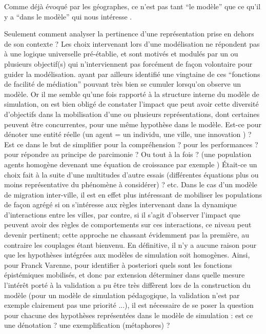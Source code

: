 Comme déjà évoqué par les géographes, ce n'est pas tant \enquote{le modèle} que ce qu'il y a \enquote{dans le modèle} qui nous intéresse \autocites{Sanders2000, Besse2000}.

Seulement comment analyser la pertinence d'une représentation prise en dehors de son contexte ? Les choix intervenant lors d'une modélisation ne répondent pas à une logique universelle pré-établie, et sont motivés et modulés par un ou plusieurs objectif(s) qui n’interviennent pas forcément de façon volontaire pour guider la modélisation. \textcite{Varenne2013} ayant par ailleurs identifié une vingtaine de ces \enquote{fonctions de facilité de médiation} pouvant très bien se cumuler lorsqu’on observe un modèle. Or il me semble qu'une fois rapporté à la structure interne du modèle de simulation, on est bien obligé de constater l'impact que peut avoir cette diversité d'objectifs dans la mobilisation d’une ou plusieurs représentations, dont certaines peuvent être concurrentes, pour une même hypothèse dans le modèle. Est-ce pour dénoter une entité réelle (un agent = un individu, une ville, une innovation ) ? Est ce dans le but de simplifier pour la compréhension ? pour les performances ? pour répondre au principe de parcimonie ? Ou tout à la fois ? (une population agents homogène devenant une équation de croissance par exemple ) Était-ce un choix fait à la suite d’une multitudes d'autre essais (différentes équations plus ou moins représentative du phénomène à considérer) ? etc. Dans le cas d'un modèle de migration inter-ville, il est en effet plus intéressant de mobiliser les populations de façon agrégé si on s'intéresse aux règles intervenant dans la dynamique d'interactions entre les villes, par contre, si il s'agit d'observer l'impact que peuvent avoir des règles de comportements sur ces interactions, ce niveau peut devenir pertinent; cette approche ne chassant évidemment pas la première, au contraire les couplages étant bienvenu. En définitive, il n'y a aucune raison pour que les hypothèses intégrées aux modèles de simulation soit homogènes. Ainsi, pour Franck Varenne, pour identifier à posteriori quels sont les fonctions épistémiques mobilisés, et donc par extension déterminer dans quelle mesure l'intérêt porté à la validation a pu être très diffèrent lors de la construction du modèle (pour un modèle de simulation pédagogique, la validation n’est par exemple clairement pas une priorité ...), il est nécessaire de se poser la question pour chacune des hypothèses représentées dans le modèle de simulation : est ce une dénotation ? une exemplification (métaphores) ?

